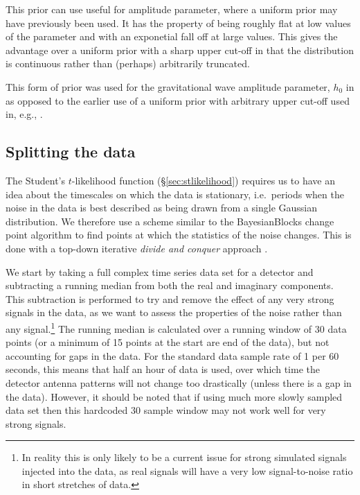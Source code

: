 This prior can use useful for amplitude parameter, where a uniform prior may have previously been used. It has the property of being roughly
flat at low values of the parameter and with an exponetial fall off at large values. This gives the advantage over a uniform prior with a
sharp upper cut-off in that the distribution is continuous rather than (perhaps) arbitrarily truncated.

This form of prior was used for the gravitational wave amplitude parameter, $h_0$ in \citet{2017arXiv170107709T} as opposed to the earlier use of
a uniform prior with arbitrary upper cut-off used in, e.g., \citet{2014ApJ...785..119A}.

\subsection{Splitting the data}\label{sec:splitting}

The Student's $t$-likelihood function (\S\ref{sec:stlikelihood}) requires us to have an idea about the timescales on which the data is
stationary, i.e.\ periods when the noise in the data is best described as being drawn from a single
Gaussian distribution. We therefore use a scheme similar to the BayesianBlocks change point algorithm
\citep{1998ApJ...504..405S} to find points at which the statistics of the noise changes. This is done with
a top-down iterative {\it divide and conquer} approach \citep{2000physics...9033S}.

We start by taking a full complex time series data set for a detector and subtracting a running median from both
the real and imaginary components. This
subtraction is performed to try and remove the effect of any very strong signals in the data, as we want to
assess the properties of the noise rather than any signal.\footnote{In reality this is only likely to be a current issue for strong
simulated signals injected into the data, as real signals will have a very low signal-to-noise ratio in short stretches of data.} The running median is calculated over a running window
of 30 data points (or a minimum of 15 points at the start are end of the data), but not accounting for gaps in the data.
For the standard data sample rate of
1 per 60 seconds, this means that half an hour of data is used, over which time the detector antenna patterns will not change
too drastically (unless there is a gap in the data). However, it should be noted that if using much more slowly sampled data set
then this hardcoded 30 sample window may not work well for very strong signals.

